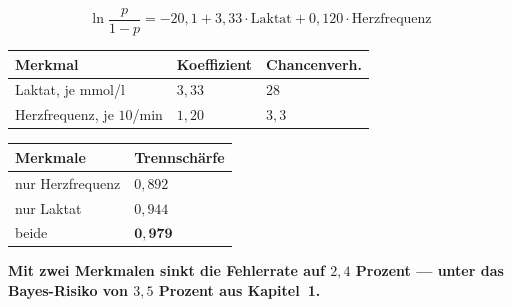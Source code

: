 \begin{merksatz}
\[ \ln\frac{p}{1-p} = -20{,}1 + 3{,}33\cdot\text{Laktat} + 0{,}120\cdot\text{Herzfrequenz} \]

\begin{center}
{\small
\renewcommand{\arraystretch}{1.5}
\begin{tabular}{@{}P{3.2cm}P{2.4cm}P{2.4cm}@{}}
\toprule
\textbf{Merkmal} & \textbf{Koeffizient} & \textbf{Chancenverh.}\\
\midrule
Laktat, je mmol/l & $3{,}33$ & $28$\\
Herzfrequenz, je $10$/min & $1{,}20$ & $3{,}3$\\
\bottomrule
\end{tabular}}
\end{center}

\begin{center}
{\small
\renewcommand{\arraystretch}{1.5}
\begin{tabular}{@{}P{3.2cm}P{2.4cm}@{}}
\toprule
\textbf{Merkmale} & \textbf{Trennschärfe}\\
\midrule
nur Herzfrequenz & $0{,}892$\\
nur Laktat & $0{,}944$\\
beide & $\mathbf{0{,}979}$\\
\bottomrule
\end{tabular}}
\end{center}

\begin{center}
\begin{minipage}{0.9\textwidth}
\textbf{Mit zwei Merkmalen sinkt die Fehlerrate auf $2{,}4$ Prozent --- unter das Bayes-Risiko von $3{,}5$ Prozent aus Kapitel~1.}
\end{minipage}
\end{center}

\begin{center}
\begin{minipage}{0.88\textwidth}
\end{minipage}
\end{center}
\end{merksatz}


